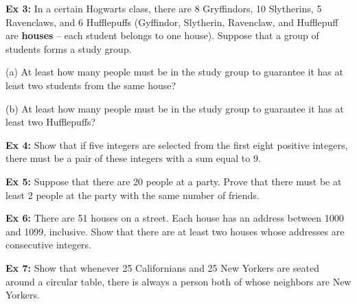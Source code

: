 \documentclass[fleqn]{article}
\theoremstyle{definition}
\begin{document}
\vspace{.25cm}

\textbf{Ex 3:} In a certain Hogwarts class, there are 8 Gryffindors, 10 Slytherins, 5 Ravenclaws, and 6 Hufflepuffs (Gyffindor, Slytherin, Ravenclaw, and Hufflepuff are \textbf{houses} -- each student belongs to one house). Suppose that a group of students forms a study group. 

\vspace{.25cm}
(a) At least how many people must be in the study group to guarantee it has at least two students from the same house?

\vspace{4cm}
(b) At least how many people must be in the study group to guarantee it has at least two Hufflepuffs? 

\vspace{4cm}


\textbf{Ex 4:} Show that if five integers are selected from the first eight positive integers, there must be a pair of these integers with a sum equal to 9. 




\newpage


\textbf{Ex 5:} Suppose that there are 20 people at a party. Prove that there must be at least 2 people at the party with the same number of friends. 



\vspace{7cm}


\textbf{Ex 6:} There are 51 houses on a street. Each house has an address between 1000 and 1099, inclusive. Show that there are at least two houses whose addresses are consecutive integers. 


\vspace{6cm}


\textbf{Ex 7:} Show that whenever 25 Californians and 25 New Yorkers are seated around a circular table, there is always a person both of whose neighbors are New Yorkers. 
\end{document}
